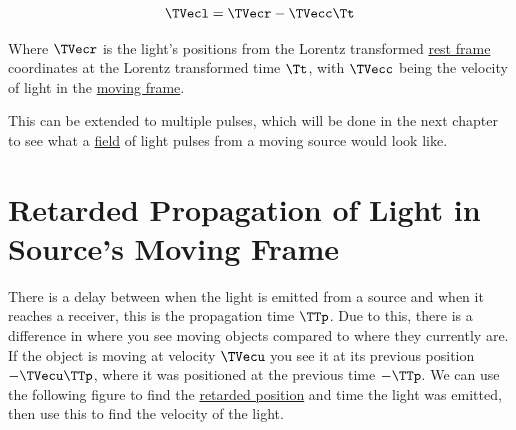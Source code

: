\begin{equation}
	\label{eq: synced time light}
	\TVecl  = \TVecr  - \TVecc  \Tt
\end{equation}

Where $\TVecr $ is the light's positions from the Lorentz transformed \hyperlink{def-proper-frame}{rest frame} coordinates at the Lorentz transformed time $\Tt $, with $\TVecc $ being the velocity of light in the \hyperlink{def-Moving-Frame}{moving frame}.

This can be extended to multiple pulses, which will be done in the next chapter to see what a \hyperlink{def-field}{field} of light pulses from a moving source would look like.



\section{Retarded Propagation of Light in Source's Moving Frame} \label{subsect: Retarded Light Propagation}

There is a delay between when the light is emitted from a source and when it reaches a receiver, this is the propagation time $\TTp$.
Due to this, there is a difference in where you see moving objects compared to where they currently are.
If the object is moving at velocity $\TVecu $ you see it at its previous position $-\TVecu  \TTp $, where it was positioned at the previous time $-\TTp $.
We can use the following figure to find the \hyperlink{def-retarded-position}{retarded position} and time the light was emitted, then use this to find the velocity of the light.

